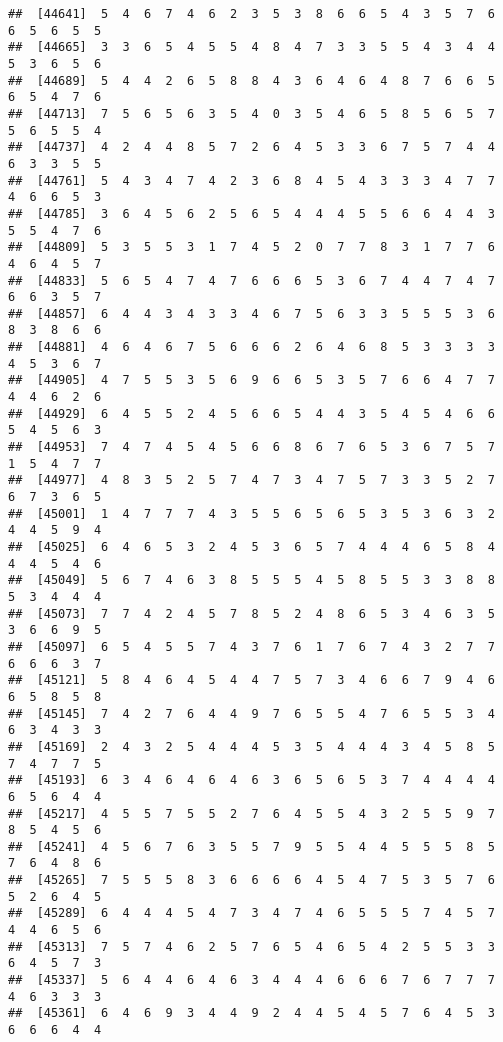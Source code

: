 \documentclass[
]{book}
\begin{document}
\begin{verbatim}
##  [44641]  5  4  6  7  4  6  2  3  5  3  8  6  6  5  4  3  5  7  6  6  5  6  5  5
##  [44665]  3  3  6  5  4  5  5  4  8  4  7  3  3  5  5  4  3  4  4  5  3  6  5  6
##  [44689]  5  4  4  2  6  5  8  8  4  3  6  4  6  4  8  7  6  6  5  6  5  4  7  6
##  [44713]  7  5  6  5  6  3  5  4  0  3  5  4  6  5  8  5  6  5  7  5  6  5  5  4
##  [44737]  4  2  4  4  8  5  7  2  6  4  5  3  3  6  7  5  7  4  4  6  3  3  5  5
##  [44761]  5  4  3  4  7  4  2  3  6  8  4  5  4  3  3  3  4  7  7  4  6  6  5  3
##  [44785]  3  6  4  5  6  2  5  6  5  4  4  4  5  5  6  6  4  4  3  5  5  4  7  6
##  [44809]  5  3  5  5  3  1  7  4  5  2  0  7  7  8  3  1  7  7  6  4  6  4  5  7
##  [44833]  5  6  5  4  7  4  7  6  6  6  5  3  6  7  4  4  7  4  7  6  6  3  5  7
##  [44857]  6  4  4  3  4  3  3  4  6  7  5  6  3  3  5  5  5  3  6  8  3  8  6  6
##  [44881]  4  6  4  6  7  5  6  6  6  2  6  4  6  8  5  3  3  3  3  4  5  3  6  7
##  [44905]  4  7  5  5  3  5  6  9  6  6  5  3  5  7  6  6  4  7  7  4  4  6  2  6
##  [44929]  6  4  5  5  2  4  5  6  6  5  4  4  3  5  4  5  4  6  6  5  4  5  6  3
##  [44953]  7  4  7  4  5  4  5  6  6  8  6  7  6  5  3  6  7  5  7  1  5  4  7  7
##  [44977]  4  8  3  5  2  5  7  4  7  3  4  7  5  7  3  3  5  2  7  6  7  3  6  5
##  [45001]  1  4  7  7  7  4  3  5  5  6  5  6  5  3  5  3  6  3  2  4  4  5  9  4
##  [45025]  6  4  6  5  3  2  4  5  3  6  5  7  4  4  4  6  5  8  4  4  4  5  4  6
##  [45049]  5  6  7  4  6  3  8  5  5  5  4  5  8  5  5  3  3  8  8  5  3  4  4  4
##  [45073]  7  7  4  2  4  5  7  8  5  2  4  8  6  5  3  4  6  3  5  3  6  6  9  5
##  [45097]  6  5  4  5  5  7  4  3  7  6  1  7  6  7  4  3  2  7  7  6  6  6  3  7
##  [45121]  5  8  4  6  4  5  4  4  7  5  7  3  4  6  6  7  9  4  6  6  5  8  5  8
##  [45145]  7  4  2  7  6  4  4  9  7  6  5  5  4  7  6  5  5  3  4  6  3  4  3  3
##  [45169]  2  4  3  2  5  4  4  4  5  3  5  4  4  4  3  4  5  8  5  7  4  7  7  5
##  [45193]  6  3  4  6  4  6  4  6  3  6  5  6  5  3  7  4  4  4  4  6  5  6  4  4
##  [45217]  4  5  5  7  5  5  2  7  6  4  5  5  4  3  2  5  5  9  7  8  5  4  5  6
##  [45241]  4  5  6  7  6  3  5  5  7  9  5  5  4  4  5  5  5  8  5  7  6  4  8  6
##  [45265]  7  5  5  5  8  3  6  6  6  6  4  5  4  7  5  3  5  7  6  5  2  6  4  5
##  [45289]  6  4  4  4  5  4  7  3  4  7  4  6  5  5  5  7  4  5  7  4  4  6  5  6
##  [45313]  7  5  7  4  6  2  5  7  6  5  4  6  5  4  2  5  5  3  3  6  4  5  7  3
##  [45337]  5  6  4  4  6  4  6  3  4  4  4  6  6  6  7  6  7  7  7  4  6  3  3  3
##  [45361]  6  4  6  9  3  4  4  9  2  4  4  5  4  5  7  6  4  5  3  6  6  6  4  4

\end{verbatim}
\end{document}
